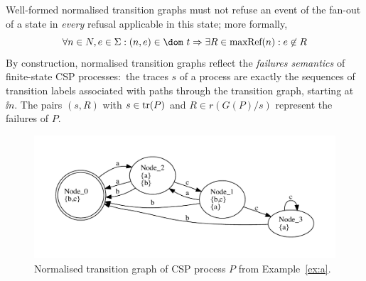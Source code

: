 Well-formed normalised transition graphs must not refuse an event of the
fan-out of a state in {\it every} refusal applicable in this state; more
formally,
\begin{equation}
\label{eq:wellformedg}
\forall n\in N, e\in\Sigma: (n,e)\in\dom~t \Rightarrow
\exists R\in \maxrefs(n): e\not\in R
\end{equation}
%
By construction, normalised transition graphs reflect the \emph{failures
semantics} of finite-state CSP processes:~the traces $s$ of a process are
exactly the sequences of transition labels associated with paths through the
transition graph, starting at $\ii n$. The pairs $(s,R)$ with $s\in\text{tr}(P)$
and $R\in r(G(P)/s)$ represent the failures of $P$.

 \begin{figure}
 \begin{center}
\includegraphics[width=\textwidth]{q0.pdf}
\end{center}
\caption{Normalised transition graph of CSP process $P$ from Example~\ref{ex:a}.}
 \label{fig:tga}
 \end{figure}

